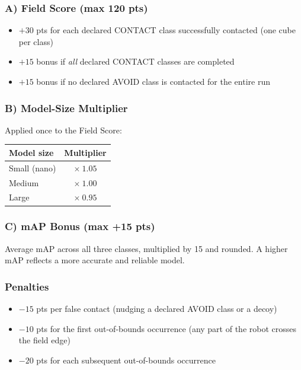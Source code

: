 \documentclass[11pt,a4paper]{article}
\begin{document}
\subsubsection*{A) Field Score (max 120 pts)}

\begin{itemize}
    \item $+30$ pts for each declared CONTACT class successfully contacted (one cube per class)
    \item $+15$ bonus if \textit{all} declared CONTACT classes are completed
    \item $+15$ bonus if no declared AVOID class is contacted for the entire run
\end{itemize}

\subsubsection*{B) Model-Size Multiplier}

Applied once to the Field Score:

\begin{center}
\begin{tabular}{|l|c|}
\hline
\textbf{Model size} & \textbf{Multiplier} \\
\hline
Small (nano) & $\times\ 1.05$ \\
Medium       & $\times\ 1.00$ \\
Large        & $\times\ 0.95$ \\
\hline
\end{tabular}
\end{center}

\subsubsection*{C) mAP Bonus (max +15 pts)}

Average mAP across all three classes, multiplied by 15 and rounded. A higher mAP reflects a more accurate and reliable model.

\subsubsection*{Penalties}

\begin{itemize}
    \item $-15$ pts per false contact (nudging a declared AVOID class or a decoy)
    \item $-10$ pts for the first out-of-bounds occurrence (any part of the robot crosses the field edge)
    \item $-20$ pts for each subsequent out-of-bounds occurrence
\end{itemize}
\end{document}
